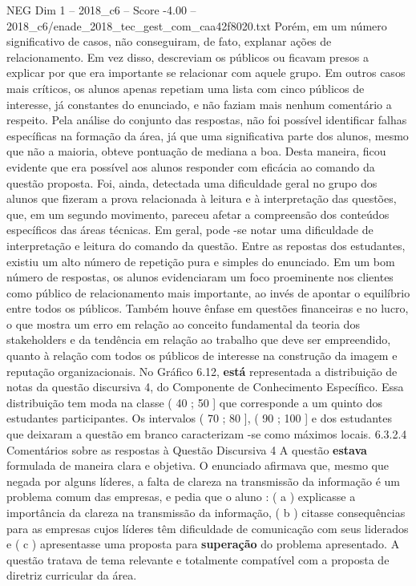 \begin{textsample}{NEG Dim 1 – 2018\_c6 – Score -4.00 – 2018\_c6/enade\_2018\_tec\_gest\_com\_caa42f8020.txt}
Porém, em um número significativo de casos, não conseguiram, de fato, explanar ações de relacionamento.
Em vez disso, descreviam os públicos ou ficavam presos a explicar por que era importante se relacionar com aquele grupo.
Em outros casos mais críticos, os alunos apenas repetiam uma lista com cinco públicos de interesse, já constantes do enunciado, e não faziam mais nenhum comentário a respeito.
Pela análise do conjunto das respostas, não foi possível identificar falhas específicas na formação da área, já que uma significativa parte dos alunos, mesmo que não a maioria, obteve pontuação de mediana a boa.
Desta maneira, ficou evidente que era possível aos alunos responder com eficácia ao comando da questão proposta.
Foi, ainda, detectada uma dificuldade geral no grupo dos alunos que fizeram a prova relacionada à leitura e à interpretação das questões, que, em um segundo movimento, pareceu afetar a compreensão dos conteúdos específicos das áreas técnicas.
Em geral, pode -se notar uma dificuldade de interpretação e leitura do comando da questão.
Entre as repostas dos estudantes, existiu um alto número de repetição pura e simples do enunciado.
Em um bom número de respostas, os alunos evidenciaram um foco proeminente nos clientes como público de relacionamento mais importante, ao invés de apontar o equilíbrio entre todos os públicos.
Também houve ênfase em questões financeiras e no lucro, o que mostra um erro em relação ao conceito fundamental da teoria dos stakeholders e da tendência em relação ao trabalho que deve ser empreendido, quanto à relação com todos os públicos de interesse na construção da imagem e reputação organizacionais.
No Gráfico 6.12, \textbf{está} representada a distribuição de notas da questão discursiva 4, do Componente de Conhecimento Específico.
Essa distribuição tem moda na classe ( 40 ; 50 ] que corresponde a um quinto dos estudantes participantes.
Os intervalos ( 70 ; 80 ], ( 90 ; 100 ] e dos estudantes que deixaram a questão em branco caracterizam -se como máximos locais. 6.3.2.4 Comentários sobre as respostas à Questão Discursiva 4 A questão \textbf{estava} formulada de maneira clara e objetiva.
O enunciado afirmava que, mesmo que negada por alguns líderes, a falta de clareza na transmissão da informação é um problema comum das empresas, e pedia que o aluno : ( a ) explicasse a importância da clareza na transmissão da informação, ( b ) citasse consequências para as empresas cujos líderes têm dificuldade de comunicação com seus liderados e ( c ) apresentasse uma proposta para \textbf{superação} do problema apresentado.
A questão tratava de tema relevante e totalmente compatível com a proposta de diretriz curricular da área.

\end{textsample}

